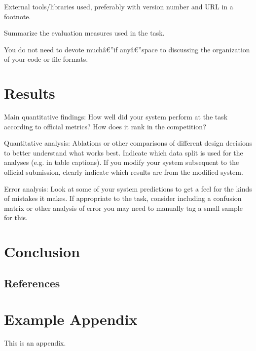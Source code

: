 \documentclass[11pt]{article}
\begin{document}
External tools/libraries used, preferably with version number and URL in a
footnote.

Summarize the evaluation measures used in the task.

You do not need to devote much\^{a}\euro ''if any\^{a}\euro ''space to
discussing the organization of your code or file formats.

\section{Results}

Main quantitative findings: How well did your system perform at the task
according to official metrics? How does it rank in the competition?

Quantitative analysis: Ablations or other comparisons of different design
decisions to better understand what works best. Indicate which data split is
used for the analyses (e.g. in table captions). If you modify your system
subsequent to the official submission, clearly indicate which results are
from the modified system.

Error analysis: Look at some of your system predictions to get a feel for
the kinds of mistakes it makes. If appropriate to the task, consider
including a confusion matrix or other analysis of error you may need to
manually tag a small sample for this.

\section{Conclusion}

\subsection{References}

\appendix

\section{Example Appendix}

\label{sec:appendix}

This is an appendix.
\end{document}
